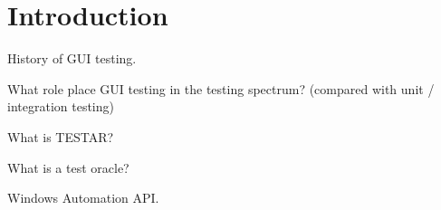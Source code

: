 \section{Introduction}

History of GUI testing.

What role place GUI testing in the testing spectrum? (compared with unit / integration testing)

What is TESTAR?

What is a test oracle?

Windows Automation API.